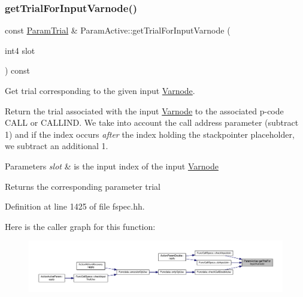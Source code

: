 \subsubsection{\texorpdfstring{getTrialForInputVarnode()}{getTrialForInputVarnode()}}
{\footnotesize\ttfamily const \mbox{\hyperlink{class_param_trial}{Param\+Trial}} \& Param\+Active\+::get\+Trial\+For\+Input\+Varnode (\begin{DoxyParamCaption}\item[{int4}]{slot }\end{DoxyParamCaption}) const\hspace{0.3cm}{\ttfamily [inline]}}



Get trial corresponding to the given input \mbox{\hyperlink{class_varnode}{Varnode}}. 

Return the trial associated with the input \mbox{\hyperlink{class_varnode}{Varnode}} to the associated p-\/code C\+A\+LL or C\+A\+L\+L\+I\+ND. We take into account the call address parameter (subtract 1) and if the index occurs {\itshape after} the index holding the stackpointer placeholder, we subtract an additional 1. 
\begin{DoxyParams}{Parameters}
{\em slot} & is the input index of the input \mbox{\hyperlink{class_varnode}{Varnode}} \\
\hline
\end{DoxyParams}
\begin{DoxyReturn}{Returns}
the corresponding parameter trial 
\end{DoxyReturn}


Definition at line 1425 of file fspec.\+hh.

Here is the caller graph for this function\+:
\nopagebreak
\begin{figure}[H]
\begin{center}
\leavevmode
\includegraphics[width=350pt]{class_param_active_a4ce9f8640c32eb48df409ff71a6e15eb_icgraph}
\end{center}
\end{figure}
\mbox{\label{class_param_active_a77a0cc16f6a28aeb1fae38416ed2c3ed}} 
